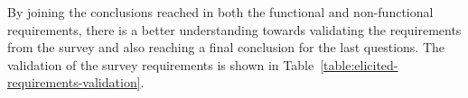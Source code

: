By joining the conclusions reached in both the functional and non-functional requirements, there is a better understanding  towards validating the requirements from the survey and also reaching a final conclusion for the last questions. The validation of the survey requirements is shown in Table~\ref{table:elicited-requirements-validation}.

